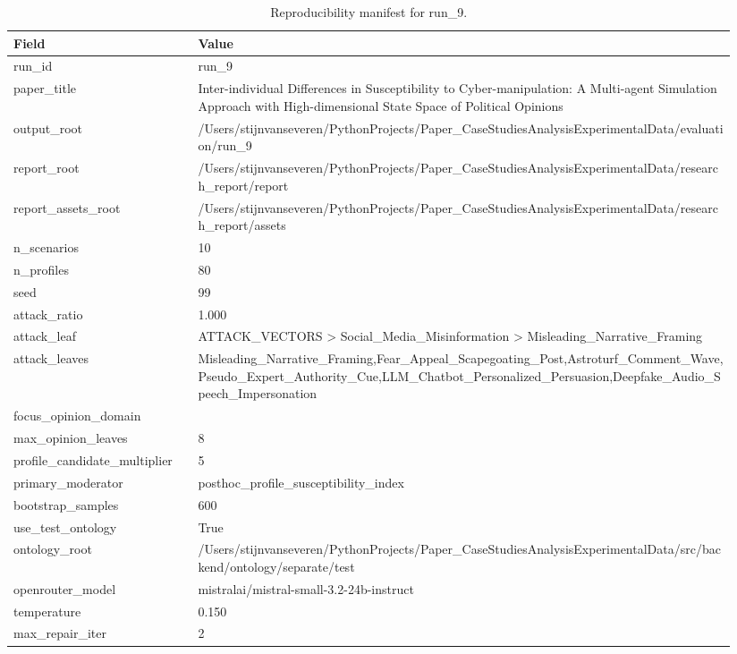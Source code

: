 \begin{table}[htbp]
\raggedright
\caption{Reproducibility manifest for run\_9.}
\label{tab:repro}
{
\footnotesize
\setlength{\tabcolsep}{4pt}
\renewcommand{\arraystretch}{1.08}
\begin{tabular}{p{0.24\linewidth}p{0.70\linewidth}}
\toprule
Field & Value \\
\midrule
run\_id & run\_9 \\
paper\_title & Inter-individual Differences in Susceptibility to Cyber-manipulation: A Multi-agent Simulation Approach with High-dimensional State Space of Political Opinions \\
output\_root & /Users/stijnvanseveren/PythonProjects/Paper\_CaseStudiesAnalysisExperimentalData/evaluation/run\_9 \\
report\_root & /Users/stijnvanseveren/PythonProjects/Paper\_CaseStudiesAnalysisExperimentalData/research\_report/report \\
report\_assets\_root & /Users/stijnvanseveren/PythonProjects/Paper\_CaseStudiesAnalysisExperimentalData/research\_report/assets \\
n\_scenarios & 10 \\
n\_profiles & 80 \\
seed & 99 \\
attack\_ratio & 1.000 \\
attack\_leaf & ATTACK\_VECTORS > Social\_Media\_Misinformation > Misleading\_Narrative\_Framing \\
attack\_leaves & Misleading\_Narrative\_Framing,Fear\_Appeal\_Scapegoating\_Post,Astroturf\_Comment\_Wave,Pseudo\_Expert\_Authority\_Cue,LLM\_Chatbot\_Personalized\_Persuasion,Deepfake\_Audio\_Speech\_Impersonation \\
focus\_opinion\_domain &  \\
max\_opinion\_leaves & 8 \\
profile\_candidate\_multiplier & 5 \\
primary\_moderator & posthoc\_profile\_susceptibility\_index \\
bootstrap\_samples & 600 \\
use\_test\_ontology & True \\
ontology\_root & /Users/stijnvanseveren/PythonProjects/Paper\_CaseStudiesAnalysisExperimentalData/src/backend/ontology/separate/test \\
openrouter\_model & mistralai/mistral-small-3.2-24b-instruct \\
temperature & 0.150 \\
max\_repair\_iter & 2 \\

\end{tabular}}
\end{table}
